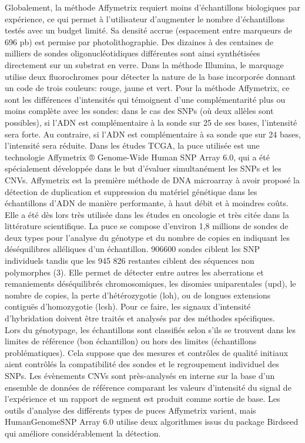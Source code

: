 \documentclass{style}
\begin{document}
Globalement, la méthode Affymetrix requiert moins d'échantillons biologiques par expérience, ce qui permet à l'utilisateur d'augmenter le nombre d'échantillons testés avec un budget limité. Sa densité accrue (espacement entre marqueurs de 696 pb) est permise par photolithographie. Des dizaines à des centaines de milliers de sondes oligonucléotidiques différentes sont ainsi synthétisées directement sur un substrat en verre. 
Dans la méthode Illumina, le marquage utilise deux fluorochromes pour détecter la nature de la base incorporée donnant un code de trois couleurs: rouge, jaune et vert. Pour la méthode Affymetrix, ce sont les différences d’intensités qui témoignent d’une complémentarité plus ou moins complète avec les sondes: dans le cas des SNPs (où deux allèles sont possibles), si l’ADN est complémentaire à la sonde sur 25 de ses bases, l’intensité sera forte. Au contraire, si l’ADN est complémentaire à sa sonde que sur 24 bases, l’intensité sera réduite.
Dans les études TCGA, la puce utilisée est une technologie Affymetrix ® Genome-Wide Human SNP Array 6.0, qui a été spécialement développée dans le but d'évaluer simultanément les SNPs et les CNVs. Affymetrix est la première méthode de DNA microarray à avoir proposé la détection de duplication et suppression du matériel génétique dans les échantillons d'ADN de manière performante, à haut débit et à moindres coûts. Elle a été dès lors très utilisée dans les études en oncologie et très citée dans la littérature scientifique.
La puce se compose d’environ 1,8 millions de sondes de deux types pour l'analyse du génotype et du nombre de copies en indiquant les déséquilibres alléliques d'un échantillon. 906600 sondes ciblent les SNP individuels tandis que les 945 826 restantes ciblent des séquences non polymorphes (3).
Elle permet de détecter entre autres les aberrations et remaniements déséquilibrés chromosomiques, les disomies uniparentales (\acrshort{upd}), le nombre de copies, la perte d'hétérozygotie (\acrshort{loh}), ou de longues extensions contiguës d’homozygotie (\acrshort{lcsh}).
Pour ce faire, les signaux d'intensité d'hybridation doivent être traités et analysés par des méthodes spécifiques. \\
Lors du génotypage, les échantillons sont classifiés selon s’ils se trouvent dans les limites de référence (bon échantillon) ou hors des limites (échantillons problématiques). Cela suppose que des mesures et contrôles de qualité initiaux aient contrôlés la compatibilité des sondes et le regroupement individuel des SNPs. Les évènements CNVs sont près-analysés en interne sur la base d’un ensemble de données de référence comparant les valeurs d'intensité du signal de l'expérience et un rapport de segment est produit comme sortie de base. Les outils d'analyse des différents types de puces Affymetrix varient, mais HumanGenomeSNP Array 6.0 utilise deux algorithmes issus du package Birdseed qui améliore considérablement la détection. 
\end{document}
